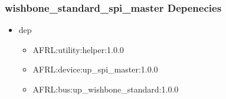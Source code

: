\subsubsection{wishbone\_standard\_spi\_master Depenecies}
\begin{itemize}
\item dep
	\begin{itemize}
	\item AFRL:utility:helper:1.0.0
	\item AFRL:device:up\_spi\_master:1.0.0
	\item AFRL:bus:up\_wishbone\_standard:1.0.0
	\end{itemize}
\end{itemize}
